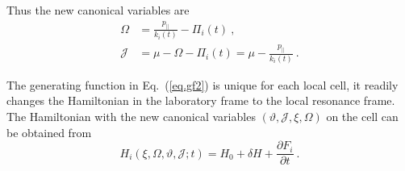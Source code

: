 Thus the new canonical variables are
\begin{equation}\label{eq.newP}
    \begin{aligned}
        \Omega & = \frac{p_{\|}}{k_{i}(t)}-\Pi_{i}(t)~,
        \\
        \mathcal{J}   & = \mu-\Omega-\Pi_{i}(t)=\mu-\frac{p_{\|}}{k_{i}(t)}~.
    \end{aligned}
\end{equation}

The generating function in Eq.~(\ref{eq.gf2}) is unique for each local cell, it readily changes the Hamiltonian in the laboratory frame to the local resonance frame.
The Hamiltonian with the new canonical variables $(\vartheta,\mathcal{J},\xi,\Omega)$ on the cell can be obtained from 
\begin{equation}\label{eq.HamiltonianK}
    H_{i} (\xi, \Omega, \vartheta, \mathcal{J} ; t)=H_{0}+ \delta H+\frac{\partial F_{i}}{\partial t}~.
\end{equation}


